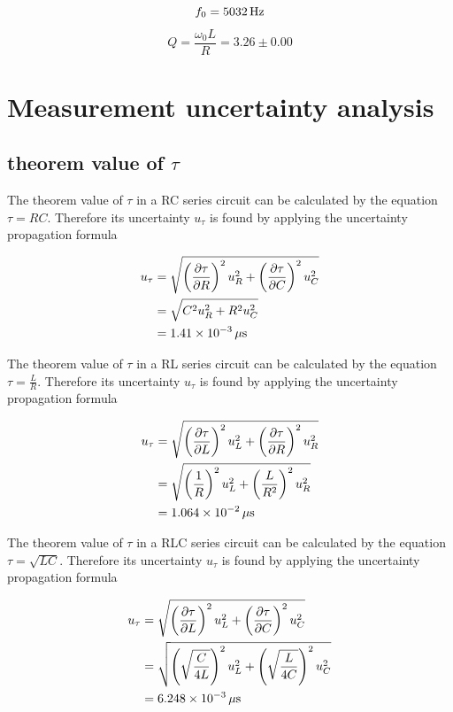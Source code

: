 \documentclass{article}
\begin{document}
$$f_0=5032\,\rm{Hz}$$
$$Q=\frac{\omega_0L}{R}=3.26\pm0.00$$

\section{Measurement uncertainty analysis}

\subsection{theorem value of $\tau$}

The theorem value of $\tau$ in a RC series circuit can be calculated by the equation $\tau=RC$. Therefore its uncertainty $u_{\tau}$ is found by applying the uncertainty propagation formula

\begin{align*}
u_{\tau}&=\sqrt{\left(\frac{\partial \tau}{\partial R}\right)^2u_R^2+\left(\frac{\partial \tau}{\partial C}\right)^2u_C^2}\\
&=\sqrt{C^2u_R^2+R^2u_C^2}\\
&=1.41\times10^{-3}\,\rm{\mu s}
\end{align*}

The theorem value of $\tau$ in a RL series circuit can be calculated by the equation $\tau=\frac{L}{R}$. Therefore its uncertainty $u_{\tau}$ is found by applying the uncertainty propagation formula

\begin{align*}
u_{\tau}&=\sqrt{\left(\frac{\partial \tau}{\partial L}\right)^2u_L^2+\left(\frac{\partial \tau}{\partial R}\right)^2u_R^2}\\
&=\sqrt{\left(\frac{1}{R}\right)^2u_L^2+\left(\frac{L}{R^2}\right)^2u_R^2}\\
&=1.064\times10^{-2}\,\rm{\mu s}
\end{align*}

The theorem value of $\tau$ in a RLC series circuit can be calculated by the equation $\tau=\sqrt{LC}$. Therefore its uncertainty $u_{\tau}$ is found by applying the uncertainty propagation formula

\begin{align*}
u_{\tau}&=\sqrt{\left(\frac{\partial \tau}{\partial L}\right)^2u_L^2+\left(\frac{\partial \tau}{\partial C}\right)^2u_C^2}\\
&=\sqrt{\left(\sqrt{\frac{C}{4L}}\right)^2u_L^2+\left(\sqrt{\frac{L}{4C}}\right)^2u_C^2}\\
&=6.248\times10^{-3}\,\rm{\mu s}
\end{align*}
\end{document}
